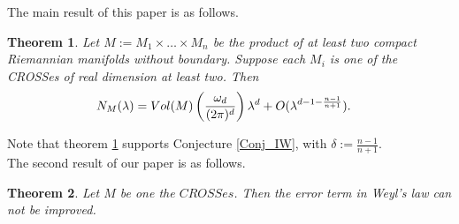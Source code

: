\documentclass[11pt,lettersize,reqno,fullpage]{amsart}
\providecommand \hf{\hspace*{0.5cm}}
\newtheorem{thm}{Theorem}[section]
\begin{document}
The main result of this paper is as follows. 
\begin{thm}
\label{MT_prod}
Let $M:= M_1 \times \ldots \times M_n$ be the product of 
at least two compact Riemannian manifolds without boundary. 
Suppose each $M_i$ is one of the CROSSes of real dimension at least two. 
Then 
\begin{align}
N_M(\lambda) & = \textnormal{Vol}(M)\left(\frac{\omega_d}{(2\pi)^d}\right)  \lambda^d + O(\lambda^{d-1-\frac{n-1}{n+1}}).
\end{align}
\end{thm}
Note that theorem \ref{MT_prod} supports Conjecture \ref{Conj_IW}, with $\delta:= \frac{n-1}{n+1}$. \\ 
\hf \hf The second result of our paper is as follows.   
\begin{thm}
\label{MR2}
Let $M$ be one the 
$CROSSes$.
Then the error term in Weyl's law can not be improved. 
\end{thm}




\end{document}
